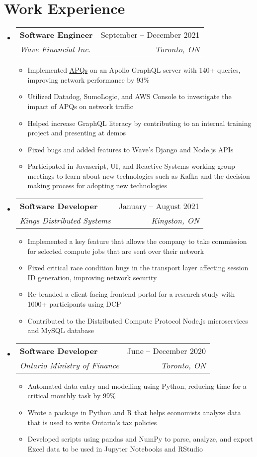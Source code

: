 \documentclass[letterpaper,11pt]{article}
\makeatletter
\newcommand{\resumeItem}[1]{
  \item\small{
    {#1 \vspace{-2pt}}
  }
}
\newcommand{\resumeSubheading}[4]{
  \vspace{-2pt}\item
    \begin{tabular*}{0.97\textwidth}[t]{l@{\extracolsep{\fill}}r}
      \textbf{#1} & #2 \\
      \textit{\small#3} & \textit{\small #4} \\
    \end{tabular*}\vspace{-7pt}
}
\newcommand{\resumeSubHeadingListStart}{\begin{itemize}[leftmargin=0.15in, label={}]}
\newcommand{\resumeSubHeadingListEnd}{\end{itemize}}
\newcommand{\resumeItemListStart}{\begin{itemize}}
\newcommand{\resumeItemListEnd}{\end{itemize}\vspace{-5pt}}
\makeatother
\begin{document}
\section{Work Experience}
  \resumeSubHeadingListStart
  
  \resumeSubheading
      {Software Engineer}{September -- December 2021}
      {Wave Financial Inc.}{Toronto, ON}
      \resumeItemListStart 
        \resumeItem{Implemented \href{https://www.apollographql.com/docs/apollo-server/performance/apq/}{\underline{APQs}} on an Apollo GraphQL server with 140+ queries, improving network performance by 93\%}
         \resumeItem{Utilized Datadog, SumoLogic, and AWS Console to investigate the impact of APQs on network traffic}
         \resumeItem{Helped increase GraphQL literacy by contributing to an internal training project and presenting at demos}
         \resumeItem{Fixed bugs and added features to Wave's Django and Node.js APIs}
         \resumeItem{Participated in Javascript, UI, and Reactive Systems working group meetings to learn about new technologies such as Kafka and the decision making process for adopting new technologies}
      \resumeItemListEnd
  
  \resumeSubheading
      {Software Developer}{January -- August 2021}
      {Kings Distributed Systems}{Kingston, ON}
      \resumeItemListStart
        \resumeItem{Implemented a key feature that allows the company to take commission for selected compute jobs that are sent over their network}
        \resumeItem{Fixed critical race condition bugs in the transport layer affecting session ID generation, improving network security}
        \resumeItem{Re-branded a client facing frontend portal for a research study with 1000+ participants using DCP}
        \resumeItem{Contributed to the Distributed Compute Protocol Node.js microservices and MySQL database}
      \resumeItemListEnd

   \resumeSubheading
      {Software Developer}{June -- December 2020}
      {Ontario Ministry of Finance}{Toronto, ON}
      \resumeItemListStart
        \resumeItem{Automated data entry and modelling using Python, reducing time for a critical monthly task by 99\%}
        \resumeItem{Wrote a package in Python and R that helps economists analyze data that is used to write Ontario's tax policies}
        \resumeItem{Developed scripts using pandas and NumPy to parse, analyze, and export Excel data to be used in Jupyter Notebooks and RStudio}
      \resumeItemListEnd

  \resumeSubHeadingListEnd
  
\end{document}
